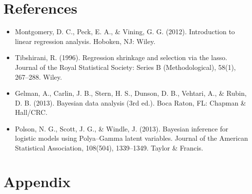 \documentclass[
  doc,floatsintext]{apa6}
\providecommand{\tightlist}{%
  \setlength{\itemsep}{0pt}\setlength{\parskip}{0pt}}
\begin{document}
\newpage

\section{References}\label{references}

\begin{itemize}
\tightlist
\item
  Montgomery, D. C., Peck, E. A., \& Vining, G. G. (2012). Introduction to linear regression analysis. Hoboken, NJ: Wiley.
\item
  Tibshirani, R. (1996). Regression shrinkage and selection via the lasso. Journal of the Royal Statistical Society: Series B (Methodological), 58(1), 267--288. Wiley.
\item
  Gelman, A., Carlin, J. B., Stern, H. S., Dunson, D. B., Vehtari, A., \& Rubin, D. B. (2013). Bayesian data analysis (3rd ed.). Boca Raton, FL: Chapman \& Hall/CRC.
\item
  Polson, N. G., Scott, J. G., \& Windle, J. (2013). Bayesian inference for logistic models using Polya--Gamma latent variables. Journal of the American Statistical Association, 108(504), 1339--1349. Taylor \& Francis.
\end{itemize}

\newpage
\appendix

\section{Appendix}\label{appendix}
\end{document}

